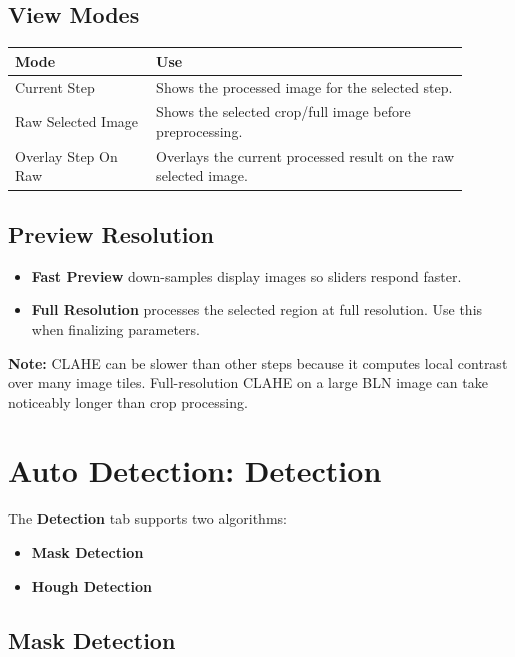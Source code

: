 \documentclass[11pt]{article}
\newcommand{\ui}[1]{\textbf{#1}}
\newcommand{\note}[1]{\vspace{0.3em}\noindent\textcolor{blue!70!black}{\textbf{Note:}} #1\vspace{0.3em}}
\begin{document}
\subsection{View Modes}

\begin{longtable}{p{0.28\linewidth}p{0.62\linewidth}}
\toprule
\textbf{Mode} & \textbf{Use} \\
\midrule
Current Step & Shows the processed image for the selected step. \\
Raw Selected Image & Shows the selected crop/full image before preprocessing. \\
Overlay Step On Raw & Overlays the current processed result on the raw selected image. \\
\bottomrule
\end{longtable}

\subsection{Preview Resolution}

\begin{itemize}
    \item \ui{Fast Preview} down-samples display images so sliders respond faster.
    \item \ui{Full Resolution} processes the selected region at full resolution. Use this when finalizing parameters.
\end{itemize}

\note{CLAHE can be slower than other steps because it computes local contrast over many image tiles. Full-resolution CLAHE on a large BLN image can take noticeably longer than crop processing.}

\section{Auto Detection: Detection}

The \ui{Detection} tab supports two algorithms:

\begin{itemize}
    \item \ui{Mask Detection}
    \item \ui{Hough Detection}
\end{itemize}

\subsection{Mask Detection}
\end{document}
